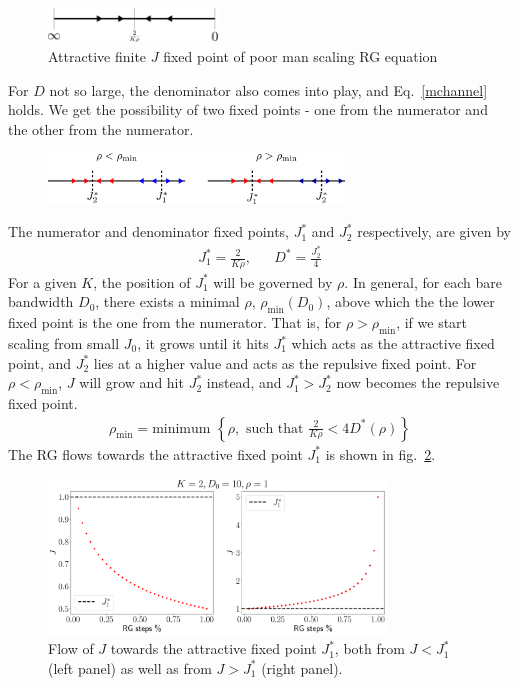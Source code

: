 \documentclass[12pt]{revtex4-2}
\begin{document}
\begin{figure}[!htb]
	\centering
	\includegraphics[width=0.4\textwidth]{rg_flow_pms.pdf}
	\caption{Attractive finite \(J\) fixed point of poor man scaling RG equation}
\end{figure}
For \(D\) not so large, the denominator also comes into play, and Eq.~\ref{mchannel} holds. We get the possibility of two fixed points - one from the numerator and the other from the numerator.
\begin{figure}[!htb]
	\centering
	\includegraphics[width=0.7\textwidth]{./rg_flow.pdf}
	\caption{}
	\label{rg_flow_general}
\end{figure}

The numerator and denominator fixed points, \(J_1^*\) and \(J_2^*\) respectively, are given by
\begin{align}
	J_1^* = \frac{2}{K \rho}, && D^* = \frac{J_2^*}{4}
\end{align}
For a given \(K\), the position of \(J_1^*\) will be governed by \(\rho\). In general, for each bare bandwidth \(D_0\), there exists a minimal \(\rho\), $\rho_\text{min}(D_0)$, above which the the lower fixed point is the one from the numerator. That is, for \(\rho > \rho_\text{min}\), if we start scaling from small \(J_0\), it grows until it hits \(J_1^*\) which acts as the attractive fixed point, and \(J_2^*\) lies at a higher value and acts as the repulsive fixed point. For \(\rho < \rho_\text{min}\), \(J\) will grow and hit \(J_2^*\) instead, and \(J_1^* > J_2^*\) now becomes the repulsive fixed point.
\begin{align}
	\rho_\text{min} = \text{minimum }\left\{\rho, \text{ such that } \frac{2}{K \rho} < 4 D^*(\rho)\right\}
\end{align}
The RG flows towards the attractive fixed point \(J_1^*\) is shown  in fig.~\ref{rg_flow_K-2}.
\begin{figure}[!htpb]
	\centering
	\includegraphics[width=0.8\textwidth]{../numerics/rg_flow_K=2.pdf}
	\caption{Flow of \(J\) towards the attractive fixed point \(J_1^*\), both from \(J<J_1^*\) (left panel) as well as from \(J>J_1^*\) (right panel).}
	\label{rg_flow_K-2}
\end{figure}
\end{document}
